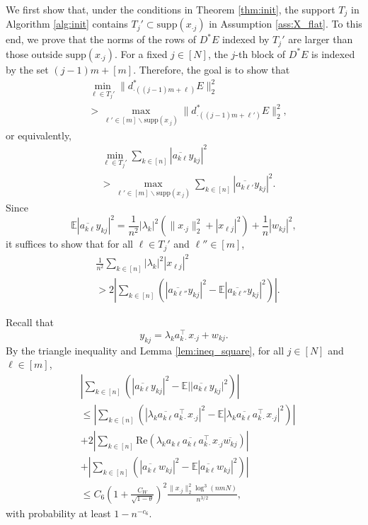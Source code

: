 \documentclass[11pt,journal]{IEEEtran}
\newcommand{\bbE}{\mathbb{E}}
\newcommand{\norm}[1]{\|{#1}\|}
\newcommand{\T}{\top}
\newcommand{\supp}{\mathrm{supp}}
\begin{document}
\begin{IEEEproof}
We first show that, under the conditions in Theorem \ref{thm:init}, the support $T_j$ in Algorithm \ref{alg:init} contains $T_j'\subset \supp(x_{\cdot j})$ in Assumption \ref{ass:X_flat}. 
To this end, we prove that the norms of the rows of $D^*E$ indexed by $T_j'$ are larger than those outside $\supp(x_{\cdot j})$. For a fixed $j\in [N]$, the $j$-th block of $D^*E$ is indexed by the set $(j-1)m + [m]$. Therefore, the goal is to show that
\begin{align*}
& \min_{\ell \in T_j'}\norm{d^*_{\cdot ((j-1)m + \ell)}E}_2^2 \\
& > \max_{\ell' \in [m]\backslash \supp(x_{\cdot j})}\norm{d^*_{\cdot((j-1)m + \ell')}E}_2^2,
\end{align*}
or equivalently,
\begin{align*}
&\min_{\ell \in T_j'} \sum_{k\in[n]} |\overline{a_{k\ell}}y_{kj}|^2 \\
& > \max_{\ell' \in [m]\backslash \supp(x_{\cdot j})} \sum_{k\in[n]} |\overline{a_{k\ell'}}y_{kj}|^2.
\end{align*}
Since
\[
\bbE |\overline{a_{k\ell}}y_{kj}|^2 = \frac{1}{n^2} |\lambda_k|^2 (\norm{x_{\cdot j}}_2^2 + |x_{\ell j}|^2) + \frac{1}{n} |w_{kj}|^2,
\]
it suffices to show that for all $\ell\in T_j'$ and $\ell''\in [m]$,
\begin{align}
&\frac{1}{n^2} \sum_{k\in[n]} |\lambda_k|^2  |x_{\ell j}|^2  \nonumber \\
& > 2 \left| \sum_{k\in[n]} \left( |\overline{a_{k\ell''}}y_{kj}|^2 - \bbE |\overline{a_{k\ell''}}y_{kj}|^2\right) \right|. \label{eq:suffice}
\end{align}

Recall that
\[
y_{kj} = \lambda_k a_{k\cdot}^\T x_{\cdot j} + w_{kj}.
\]
By the triangle inequality and Lemma \ref{lem:ineq_square}, for all $j\in[N]$ and $\ell\in[m]$,
\begin{align*}
& \left| \sum_{k\in[n]} \left( |\overline{a_{k\ell}}y_{kj}|^2 - \bbE ||\overline{a_{k\ell}}y_{kj}|^2\right) \right| \\
& \leq \left| \sum_{k\in[n]} \left( | \lambda_k \overline{a_{k\ell}}a_{k\cdot}^\T x_{\cdot j}|^2 - \bbE | \lambda_k \overline{a_{k\ell}}a_{k\cdot}^\T x_{\cdot j}|^2\right) \right| \\
& + 2 \left| \sum_{k\in[n]} \mathrm{Re}\left(\lambda_k a_{k\ell} \overline{a_{k\ell}} a_{k\cdot}^\T x_{\cdot j} \overline{w_{kj}} \right) \right| \\
& + \left| \sum_{k\in[n]} \left( | \overline{a_{k\ell}} w_{kj} |^2 - \bbE | \overline{a_{k\ell}} w_{kj} |^2 \right) \right| \\
& \leq C_6 \left(1+\frac{C_W}{\sqrt{1-\theta}}\right)^2\frac{\norm{x_{\cdot j}}_2^2 \log^3 (nmN)}{n^{3/2}},
\end{align*}
with probability at least $1-n^{-c_6}$.


\end{IEEEproof}
\end{document}
